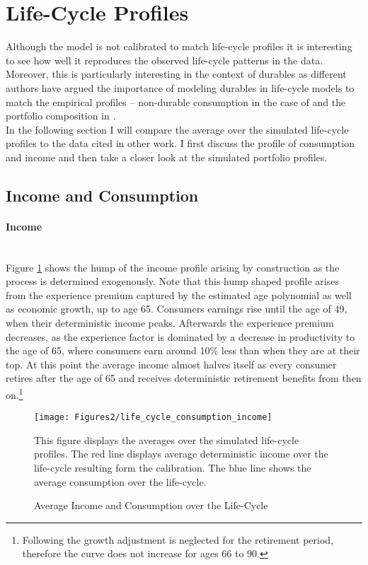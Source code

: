 \documentclass[a4paper,12pt,legno]{article}
\newcommand{\myparagraph}[1]{\paragraph{#1}\mbox{}\\}
\begin{document}
\section{Life-Cycle Profiles}
\label{life_cycle_profiles}

Although the model is not calibrated to match life-cycle profiles it is interesting to see how well it reproduces the observed life-cycle patterns in the data. Moreover, this is particularly interesting in the context of durables as different authors have argued the importance of modeling durables in life-cycle models to match the empirical profiles \--- non-durable consumption in the case of \cite{FV&K2011} and the portfolio composition in \cite{yang2009}. \\
In the following section I will compare the average over the simulated life-cycle profiles to the data cited in other work. I first discuss the profile of consumption and income and then take a closer look at the simulated portfolio profiles. 

\subsection{Income and Consumption}

\myparagraph{Income} Figure \ref{consumption_life_cycle} shows the hump of the income profile arising by construction as the process is determined exogenously. Note that this hump shaped profile arises from the experience premium captured by the estimated age polynomial as well as economic growth, up to age 65. Consumers earnings rise until the age of 49, when their deterministic income peaks. Afterwards the experience premium decreases, as the experience factor is dominated by a decrease in productivity to the age of 65, where consumers earn around 10\% less than when they are at their top. At this point the average income almost halves itself as every consumer retires after the age of 65 and receives deterministic retirement benefits from then on.\footnote{Following \cite{hintermaier2011} the growth adjustment is neglected for the retirement period, therefore the curve does not increase for ages 66 to 90.} 

\begin{figure}[!htbp]
\caption{Average Income and Consumption over the Life-Cycle} 
\label{consumption_life_cycle}	%
\centering
\texttt{[image: Figures2/life\_cycle\_consumption\_income]}  %

\begin{minipage}{0.8\linewidth}
\footnotesize{This figure displays the averages over the simulated life-cycle profiles. The red line displays average deterministic income over the life-cycle resulting form the calibration. The blue line shows the average consumption over the life-cycle.}
\end{minipage}

\end{figure}
\end{document}
